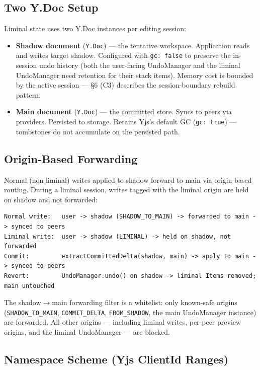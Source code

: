 \subsection{Two Y.Doc Setup}

Liminal state uses two Y.Doc instances per editing session:

\begin{itemize}
    \item \textbf{Shadow document} (\texttt{Y.Doc}) --- the tentative workspace. Application reads and writes target shadow. Configured with \texttt{gc: false} to preserve the in-session undo history (both the user-facing UndoManager and the liminal UndoManager need retention for their stack items). Memory cost is bounded by the active session --- \S6 (C3) describes the session-boundary rebuild pattern.
    \item \textbf{Main document} (\texttt{Y.Doc}) --- the committed store. Syncs to peers via providers. Persisted to storage. Retains Yjs's default GC (\texttt{gc: true}) --- tombstones do not accumulate on the persisted path.
\end{itemize}

\subsection{Origin-Based Forwarding}

Normal (non-liminal) writes applied to shadow forward to main via origin-based routing. During a liminal session, writes tagged with the liminal origin are held on shadow and not forwarded:

\begin{lstlisting}
Normal write:   user -> shadow (SHADOW_TO_MAIN) -> forwarded to main -> synced to peers
Liminal write:  user -> shadow (LIMINAL) -> held on shadow, not forwarded
Commit:         extractCommittedDelta(shadow, main) -> apply to main -> synced to peers
Revert:         UndoManager.undo() on shadow -> liminal Items removed; main untouched
\end{lstlisting}

The shadow$\rightarrow$main forwarding filter is a whitelist: only known-safe origins (\texttt{SHADOW\_TO\_MAIN}, \texttt{COMMIT\_DELTA}, \texttt{FROM\_SHADOW}, the main UndoManager instance) are forwarded. All other origins --- including liminal writes, per-peer preview origins, and the liminal UndoManager --- are blocked.

\subsection{Namespace Scheme (Yjs ClientId Ranges)}


